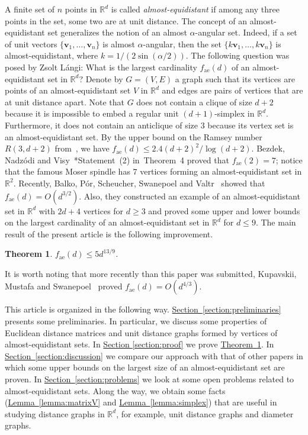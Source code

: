 \documentclass[a4paper, oneside, reqno, 12pt]{amsart}
\theoremstyle{plain}
\newtheorem{theorem}{Theorem}
\theoremstyle{definition}
\begin{document}
A finite set of $n$ points in $\mathbb R^d$ is called \textit{almost-equidistant} if among any three points in the set, some two are at unit distance. The concept of an almost-equidistant set generalizes the notion of an almost $\alpha$-angular set. Indeed, if a set of unit vectors $\{\mathbf v_1, \dots,\mathbf v_n\}$ is almost $\alpha$-angular, then the set $\{k\mathbf v_1, \dots,k\mathbf v_n\}$ is almost-equidistant, where $k=1/(2\sin (\alpha/2))$. The following question was posed by Zsolt L{\'a}ngi: What is the largest cardinality $f_{\mathrm{ae}}(d)$ of an almost-equidistant set in $\mathbb R^d$? Denote by $G=(V, E)$ a graph such that its vertices are points of an almost-equidistant set $V$ in $\mathbb R^d$ and edges are pairs of vertices that are at unit distance apart. Note that $G$ does not contain a clique of size $d+2$ because it is impossible to embed a regular unit $(d+1)$-simplex in $\mathbb R^d$. Furthermore, it does not contain an anticlique of size $3$ because its vertex set is an almost-equidistant set. By the upper bound on the Ramsey number $R(3, d+2)$ from~\cite{G83}, we have $f_{\mathrm{ae}}(d)\leq 2.4(d+2)^2/\log (d+2)$. Bezdek, Nadz{\'o}di and Visy~\cite{BNV03}*{Statement~(2) in~Theorem~4} proved that $f_{\mathrm{ae}}(2)=7$; notice that the famous Moser spindle has $7$ vertices forming an almost-equidistant set in $\mathbb R^2$. Recently, Balko, P{\'o}r, Scheucher, Swanepoel and Valtr~\cite{BPSSV16} showed that $f_{\mathrm{ae}}(d)=O(d^{3/2})$. Also, they constructed an example of an almost-equidistant set in $\mathbb R^d$ with $2d+4$ vertices for $d\geq 3$ and proved some upper and lower bounds on the largest cardinality of an almost-equidistant set in $\mathbb R^d$ for $d\leq 9$. The main result of the present article is the following improvement.
\begin{theorem}\label{theorem:almost}
$f_{\mathrm{ae}}(d)\leq 5d^{13/9}$.
\end{theorem}
It is worth noting that more recently than this paper was submitted, Kupavskii, Mustafa and Swanepoel~\cite{KMS17} proved $f_{\mathrm{ae}}(d)=O(d^{4/3})$. 

This article is organized in the following way. \hyperref[section:preliminaries]{Section~\ref*{section:preliminaries}} presents some preliminaries. In particular, we discuss some properties of Euclidean distance matrices and unit distance graphs formed by vertices of almost-equidistant sets. In \hyperref[section:proof]{Section \ref*{section:proof}} we prove \hyperref[theorem:almost]{Theorem~\ref*{theorem:almost}}. In \hyperref[section:discussion]{Section~\ref*{section:discussion}} we compare our approach with that of other papers in which some upper bounds on the largest size of an almost-equidistant set are proven. In \hyperref[section:problems]{Section~\ref*{section:problems}} we look at some open problems related to almost-equidistant sets. Along the way, we obtain some facts (\hyperref[lemma:matrixV]{Lemma~\ref*{lemma:matrixV}} and \hyperref[lemma:simplex]{Lemma~\ref*{lemma:simplex}}) that are useful in studying distance graphs in $\mathbb R^d$, for example, unit distance graphs and diameter graphs.
\end{document}

